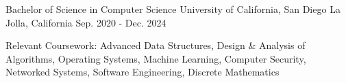 

\begin{cventries}

  \cventry
    {Bachelor of Science in Computer Science}
    {University of California, San Diego}
    {La Jolla, California}
    {Sep. 2020 - Dec. 2024}
    {
      \begin{cvitems}
        \item {Relevant Coursework: Advanced Data Structures, Design \& Analysis of Algorithms, Operating Systems, Machine Learning, Computer Security, Networked Systems, Software Engineering, Discrete Mathematics}
      \end{cvitems}
    }

\end{cventries}
